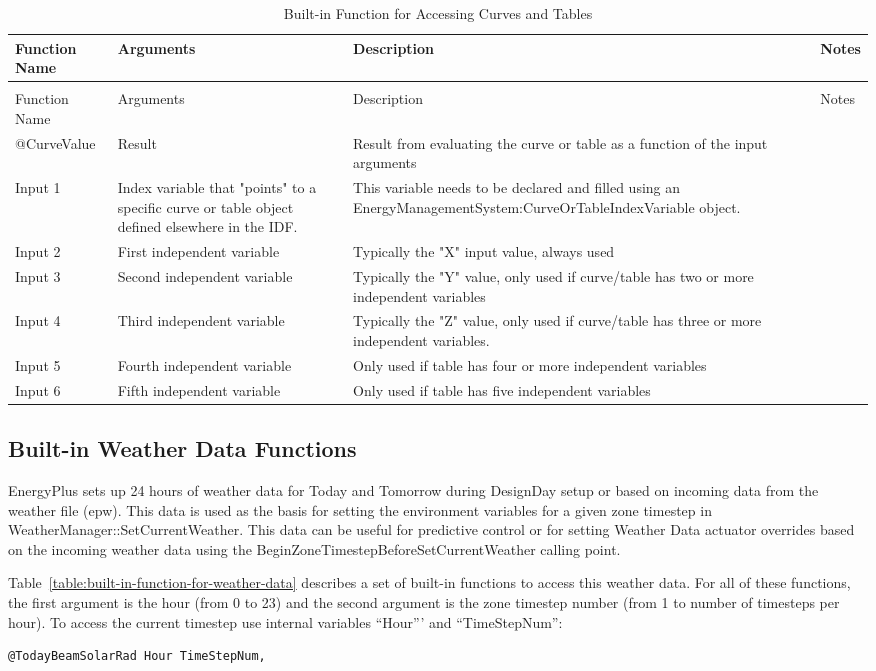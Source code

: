 \begin{longtable}[c]{p{1.5in}p{1.5in}p{1.5in}p{1.5in}}
\caption{Built-in Function for Accessing Curves and Tables \label{table:built-in-function-for-accessing-curves}} \tabularnewline
\toprule
Function Name & Arguments & Description & Notes \tabularnewline
\midrule
\endfirsthead

\caption[]{Built-in Function for Accessing Curves and Tables} \tabularnewline
\toprule
Function Name & Arguments & Description & Notes \tabularnewline
\midrule
\endhead

@CurveValue & Result & Result from evaluating the curve or table as a function of the input arguments &  \tabularnewline
Input 1 & Index variable that "points" to a specific curve or table object defined elsewhere in the IDF. & This variable needs to be declared and filled using an EnergyManagementSystem:CurveOrTableIndexVariable object. \tabularnewline
Input 2 & First independent variable & Typically the "X" input value, always used \tabularnewline
Input 3 & Second independent variable & Typically the "Y" value, only used if curve/table has two or more independent variables \tabularnewline
Input 4 & Third independent variable & Typically the "Z" value, only used if curve/table has three or more independent variables. \tabularnewline
Input 5 & Fourth independent variable & Only used if table has four or more independent variables \tabularnewline
Input 6 & Fifth independent variable & Only used if table has five independent variables \tabularnewline
\bottomrule
\end{longtable}

\subsection{Built-in Weather Data Functions}\label{built-in-weather-data-functions}

EnergyPlus sets up 24 hours of weather data for Today and Tomorrow during DesignDay setup or based on incoming data from the weather file (epw). This data is used as the basis for setting the environment variables for a given zone timestep in WeatherManager::SetCurrentWeather. This data can be useful for predictive control or for setting Weather Data actuator overrides based on the incoming weather data using the BeginZoneTimestepBeforeSetCurrentWeather calling point.

Table~\ref{table:built-in-function-for-weather-data} describes a set of built-in functions to access this weather data. For all of these functions, the first argument is the hour (from 0 to 23) and the second argument is the zone timestep number (from 1 to number of timesteps per hour). To access the current timestep use internal variables ``Hour''' and ``TimeStepNum'':
\begin{lstlisting}
@TodayBeamSolarRad Hour TimeStepNum,
\end{lstlisting}

